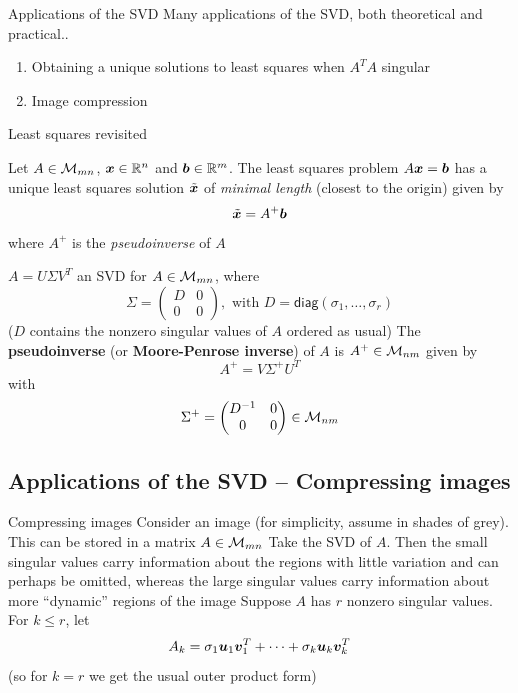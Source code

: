 \documentclass[aspectratio=169]{beamer}\usepackage[]{graphicx}\usepackage[]{xcolor}
\begin{document}
\begin{frame}{Applications of the SVD}
Many applications of the SVD, both theoretical and practical..
\vfill
\begin{enumerate}
\item Obtaining a unique solutions to least squares when $A^TA$ singular
\item Image compression
\end{enumerate}
\end{frame}


\begin{frame}{Least squares revisited}
\begin{theorem}
Let $A\in\mathcal{M}_{mn}$, $\bm{x}\in\mathbb{R}^n$ and $\bm{b}\in\mathbb{R}^m$. The least squares problem $A\bm{x}=\bm{b}$ has a unique least squares solution $\tilde{\bm{x}}$ of \emph{minimal length} (closest to the origin) given by
\[
\tilde{\bm{x}} = A^+\bm{b}
\]
where $A^+$ is the \emph{pseudoinverse} of $A$
\end{theorem}
\end{frame}

\begin{frame}
\begin{definition}[Pseudoinverse]
$A=U\Sigma V^T$ an SVD for $A\in\mathcal{M}_{mn}$, where 
\[
\Sigma = \begin{pmatrix}
D & 0 \\ 0 & 0
\end{pmatrix},
\textrm{ with }
D=\mathsf{diag}(\sigma_1,\ldots,\sigma_r)
\]
($D$ contains the nonzero singular values of $A$ ordered as usual)
\vskip0.5cm
The \textbf{pseudoinverse} (or \textbf{Moore-Penrose inverse}) of $A$ is $A^+\in\mathcal{M}_{nm}$ given by
\[
A^+ = V\Sigma^+ U^T
\]
with
\[
\Sigma^+ =
\begin{pmatrix}
D^{-1} & 0 \\ 0 & 0
\end{pmatrix}\in\mathcal{M}_{nm}
\]
\end{definition}
\end{frame}


\subsection{Applications of the SVD -- Compressing images}


\begin{frame}{Compressing images}
Consider an image (for simplicity, assume in shades of grey). This can be stored in a matrix $A\in\mathcal{M}_{mn}$
\vfill
Take the SVD of $A$. Then the small singular values carry information about the regions with little variation and can perhaps be omitted, whereas the large singular values carry information about more ``dynamic'' regions of the image
\vfill
Suppose $A$  has $r$ nonzero singular values. For $k\leq r$, let
\[
A_k = \sigma_1\bm{u}_1\bm{v}_1^T+\cdots+\sigma_k\bm{u}_k\bm{v}_k^T
\]
(so for $k=r$ we get the usual outer product form)
\end{frame}
\end{document}
